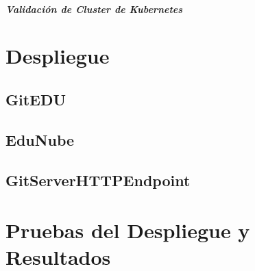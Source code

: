 \subparagraph{Validación de Cluster de Kubernetes}
  

\section{Despliegue}
% 

\subsection{GitEDU}

\subsection{EduNube}

\subsection{GitServerHTTPEndpoint}

\section{Pruebas del Despliegue y Resultados}

